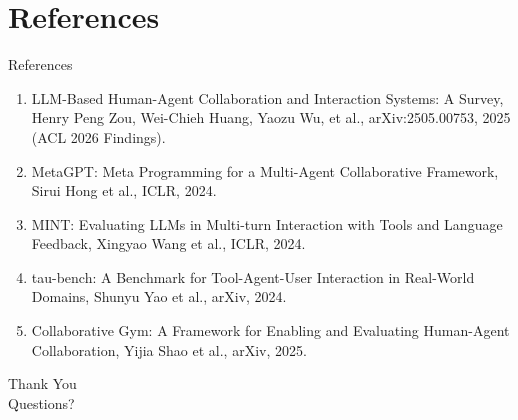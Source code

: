 \documentclass[10pt]{beamer}
\begin{document}
\section{References}
\begin{frame}[allowframebreaks]{References}
  \footnotesize
  \begin{enumerate}
    \item LLM-Based Human-Agent Collaboration and Interaction Systems: A Survey, Henry Peng Zou, Wei-Chieh Huang, Yaozu Wu, et al., arXiv:2505.00753, 2025 (ACL 2026 Findings).
    \item MetaGPT: Meta Programming for a Multi-Agent Collaborative Framework, Sirui Hong et al., ICLR, 2024.
    \item MINT: Evaluating LLMs in Multi-turn Interaction with Tools and Language Feedback, Xingyao Wang et al., ICLR, 2024.
    \item tau-bench: A Benchmark for Tool-Agent-User Interaction in Real-World Domains, Shunyu Yao et al., arXiv, 2024.
    \item Collaborative Gym: A Framework for Enabling and Evaluating Human-Agent Collaboration, Yijia Shao et al., arXiv, 2025.
  \end{enumerate}
\end{frame}

\begin{frame}[plain]
  \begin{center}
    {\Huge Thank You}\\[1em]
    {\large Questions?}
  \end{center}
\end{frame}
\end{document}
